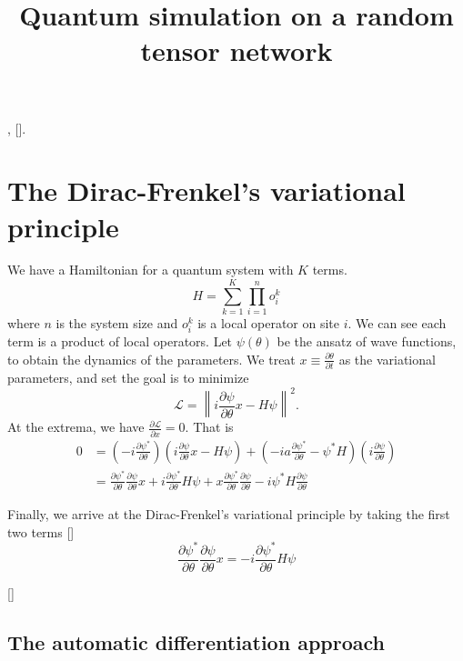 \documentclass{article}
\title{Quantum simulation on a random tensor network}
\theoremstyle{definition}
\newcommand{\blue}[1]{[{\bf  \color{blue}{JG: #1}}]}
\newcommand{\red}[1]{[{\bf  \color{red}{MD: #1}}]}
\newcommand{\yellow}[1]{[{\bf  \color{yellow}{RG: #1}}]}
\newcommand{\pdv}[2]{{\frac{\partial#1}{\partial#2}}}
\begin{document}
\maketitle
\blue{This is how you make a comment. Hi}
\red{Hi}, \yellow{Hi}.

\section{The Dirac-Frenkel's variational principle}
We have a Hamiltonian for a quantum system with $K$ terms.
\begin{equation}
    H  = \sum_{k=1}^{K} \prod_{i=1}^{n} o_i^k
\end{equation}
where $n$ is the system size and $o_i^k$ is a local operator on site $i$. We can see each term is a product of local operators.
Let $\psi(\theta)$ be the ansatz of wave functions, to obtain the dynamics of the parameters.
We treat $x \equiv \pdv{\theta}{t}$ as the variational parameters, and set the goal is to minimize~\cite{Broeckhove1988}
\begin{equation}
\mathcal{L} = \left\|i\pdv{\psi}{\theta}x-H\psi\right\|^2.
\end{equation}
At the extrema, we have $\pdv{\mathcal{L}}{x} = 0$. That is
\begin{align}
0 & = (-i\pdv{\psi^*}{\theta})(i\pdv{\psi}{\theta}x-H\psi) + (-ia\pdv{\psi^*}{\theta}-\psi^*H)(i\pdv{\psi}{\theta})\\
& = \pdv{\psi^*}{\theta}\pdv{\psi}{\theta}x+i\pdv{\psi^*}{\theta}H\psi + x\pdv{\psi^*}{\theta}\pdv{\psi}{\theta}- i\psi^*H\pdv{\psi}{\theta}
\end{align}

Finally, we arrive at the Dirac-Frenkel's variational principle by taking the first two terms
\blue{Because the wave function is analytic complex valued function, when the real parts of two functions are the same, their complex components are the same too.}
\begin{equation}
\pdv{\psi^*}{\theta}\pdv{\psi}{\theta}x = -i\pdv{\psi^*}{\theta}H\psi
\end{equation}

\blue{In tensor network representation, we can normalize tensor networks easily, so we do not need to go to the unnormalized prepresentation.}

\subsection{The automatic differentiation approach}
\end{document}
